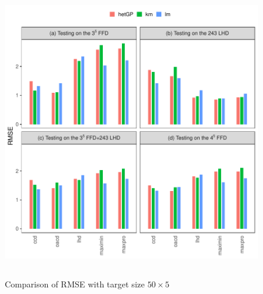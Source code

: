 \documentclass [PhD] {package/uclathes}
\begin{document}
\begin{figure}[!ht]
\centering
\includegraphics[height=5in, width=6in]{chapters/DE/pdfs/barplots2}
\caption{Comparison of RMSE with target size $50\times5$}
\label{barplots2}
\end{figure}
\end{document}
